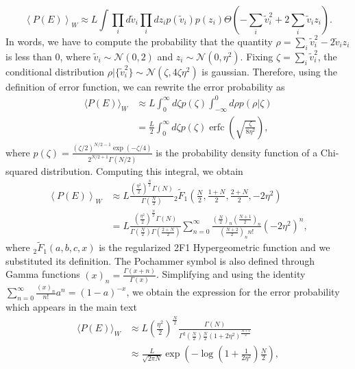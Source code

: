 \documentclass[a4paper]{article}%
\DeclareMathOperator\erfc{erfc}
\begin{document}
\begin{equation}
\left\langle P(E)\right \rangle_{W} \approx L \int\prod_{i} d \tilde{v}_{i}
\prod_{i} dz_{i} p(\tilde{v}_{i}) p(z_{i}) \Theta\left( -\sum_{i} \tilde
{v}^{2}_{i} +2\sum_{i} \tilde{v}_{i} z_{i}\right) .
\end{equation}In words, we have to compute the probability that the quantity $\rho = \sum_{i}
\tilde{v}_{i}^{2} - 2\tilde{v}_{i} z_{i}$ is less than 0, where $\tilde{v}_{i}
\sim\mathcal{N}(0,2)$ and $z_{i} \sim\mathcal{N}(0,\eta^{2})$. Fixing $\zeta= \sum_{i} \tilde{v}^{2}_{i}$, the conditional distribution 
$\rho|\{\tilde{v}_{i}^{2}\} \sim\mathcal{N}(\zeta,4\zeta\eta^{2}) $ is gaussian. Therefore, using the definition of error function, we
can rewrite the error probability as
\begin{equation}
\begin{split}
\langle P(E)\rangle_{W}  & \approx L\int_{0}^{\infty}d\zeta
p(\zeta) \int_{-\infty}^{0} d\rho p(\rho|\zeta)\\
& = \frac{L}{2}\int_{0}^{\infty}d\zeta p(\zeta)
\erfc{\left(\sqrt{\frac{\zeta}{8\eta^2}}\right)},
\end{split}
\end{equation}
where $p(\zeta) = \frac{(\zeta/2)^{N/2 -1}\exp\left(-
\zeta/4\right)}{2^{N/2 +1} \Gamma(N/2)}$ is the probability density
function of a Chi-squared distribution. Computing this integral, we obtain
\begin{equation}
\begin{split}
\left\langle P(E)\right\rangle_{W}  & \approx L \frac{(\frac{\eta^{2}}
{2})^{\frac{N}{2}}\Gamma(N)}{\Gamma(\frac{N}{2})} {}_{2}\tilde{F}_{1}\left(\frac
{N}{2},\frac{1+N}{2},\frac{2+N}{2},-2\eta^{2}\right)\\
& =L \frac{(\frac{\eta^{2}}{2})^{\frac{N}{2}}\Gamma(N)}{\Gamma(\frac{N}
{2})\Gamma(\frac{2+N}{2})}\sum_{n=0}^{\infty}\frac{(\frac{N}{2})_{n}
(\frac{N+1}{2})_{n}}{(\frac{N+2}{2})_{n} n!} (-2\eta^{2})^{n},
\end{split}
\end{equation}
where ${}_{2}\tilde{F}_{1}(a,b,c,x)$ is the regularized 2F1 Hypergeometric
function and we substituted its definition. The Pochammer symbol is also
defined through Gamma functions $(x)_{n} = \frac{\Gamma(x+n)}{\Gamma(x)}$.
Simplifying and using the identity $\sum_{n=0}^{\infty}\frac{(x)_{n}}{n!}
a^{n} = (1-a)^{-x}$, we obtain the expression for the error probability which appears in the main text
\begin{equation}
\begin{split}
\langle P(E)\rangle_{W}  & \approx L (\frac{\eta^{2}}{2})^{\frac
{N}{2}} \frac{\Gamma(N)}{\Gamma^{2}(\frac{N}{2}) \frac{N}{2} (1+2\eta
^{2})^{\frac{N+1}{2}}}\\
& \approx \frac{L}{\sqrt{2\pi N}} \exp{\left(- \log\left(1 + \frac
{1}{2\eta^{2}}\right)\frac{N}{2}\right)},
\end{split}
\label{Eq:GE}
\end{equation}
\end{document}

